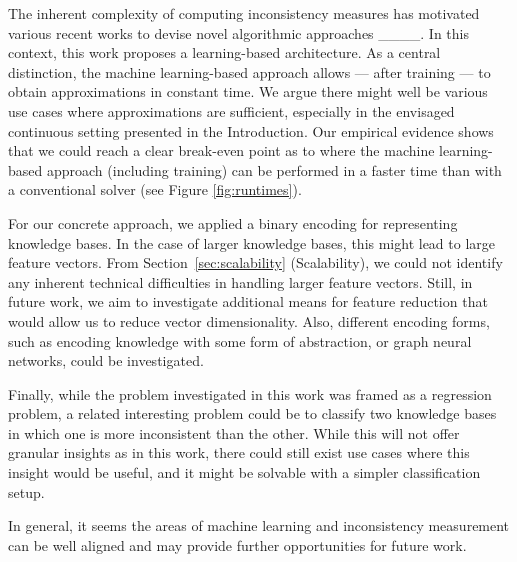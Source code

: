 The inherent complexity of computing inconsistency measures has motivated various recent works to devise novel algorithmic approaches ____. In this context, this work proposes a learning-based architecture. As a central distinction, the machine learning-based approach allows --- after training --- to obtain approximations in constant time. We argue there might well be various use cases where approximations are sufficient, especially in the envisaged continuous setting presented in the Introduction. Our empirical evidence shows that we could reach a clear break-even point as to where the machine learning-based approach (including training) can be performed in a faster time than with a conventional solver (see Figure \ref{fig:runtimes}).%

For our concrete approach, we applied a binary encoding for representing knowledge bases. In the case of larger knowledge bases, this might lead to large feature vectors. From Section~\ref{sec:scalability} (Scalability), we could not identify any inherent technical difficulties in handling larger feature vectors. Still, in future work, we aim to investigate additional means for feature reduction that would allow us to reduce vector dimensionality. Also, different encoding forms, such as encoding knowledge with some form of abstraction, or graph neural networks, could be investigated.


Finally, while the problem investigated in this work was framed as a regression problem, a related interesting problem could be to classify two knowledge bases in which one is more inconsistent than the other. While this will not offer granular insights as in this work, there could still exist use cases where this insight would be useful, and it might be solvable with a simpler classification setup. 

In general, it seems the areas of machine learning and inconsistency measurement can be well aligned and may provide further opportunities for future work.